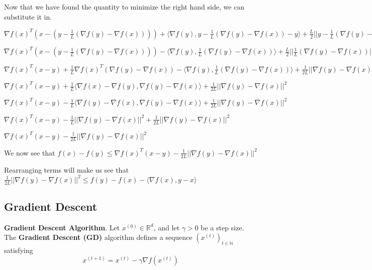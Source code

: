 Now that we have found the quantity to minimize the right hand side, we can substitute it in.

$\nabla f(x)^T(x - (y - \frac{1}{L}(\nabla f(y) - \nabla f(x)))) + \langle \nabla f(y), y - \frac{1}{L}(\nabla f(y) - \nabla f(x)) - y \rangle + \frac{L}{2} ||y - \frac{1}{L}(\nabla f(y) - \nabla f(x)) - y||^2$ \newline 

$\nabla f(x)^T(x - (y - \frac{1}{L}(\nabla f(y) - \nabla f(x)))) - \langle \nabla f(y),  \frac{1}{L}(\nabla f(y) - \nabla f(x))\rangle + \frac{L}{2} ||\frac{1}{L}(\nabla f(y) - \nabla f(x))||^2$ \newline 

$\nabla f(x)^T (x - y) + \frac{1}{L} \nabla f(x)^T (\nabla f(y) - \nabla f(x)) - \langle \nabla f(y),  \frac{1}{L}(\nabla f(y) - \nabla f(x))\rangle + \frac{1}{2L} ||\nabla f(y) - \nabla f(x)||^2$ \newline 

$\nabla f(x)^T (x - y) + \frac{1}{L} \langle \nabla f(x) - \nabla f(y), \nabla f(y) - \nabla f(x) \rangle + \frac{1}{2L} ||\nabla f(y) - \nabla f(x)||^2$ \newline 

$\nabla f(x)^T (x - y) - \frac{1}{L} \langle \nabla f(y) - \nabla f(x), \nabla f(y) - \nabla f(x) \rangle + \frac{1}{2L} ||\nabla f(y) - \nabla f(x)||^2$ \newline 

$\nabla f(x)^T (x - y) - \frac{1}{L} ||\nabla f(y) - \nabla f(x)||^2 + \frac{1}{2L} ||\nabla f(y) - \nabla f(x)||^2$ \newline 

$\nabla f(x)^T (x - y) - \frac{1}{2L} ||\nabla f(y) - \nabla f(x)||^2$ \newline 

We now see that $f(x) - f(y) \leq \nabla f(x)^T (x - y) - \frac{1}{2L} ||\nabla f(y) - \nabla f(x)||^2$

Rearranging terms will make us see that $\frac{1}{2L} ||\nabla f(y) - \nabla f(x)||^2 \leq f(y) - f(x) - \langle \nabla f(x), y - x \rangle$
\subsection{Gradient Descent}
\noindent \textbf{Gradient Descent Algorithm}. Let $x^{(0)} \in \mathbb{R}^d$, and let $\gamma > 0$ be a step size. The \textbf{Gradient Descent (GD)} algorithm defines a sequence $(x^{(t)})_{t \in \mathbb{N}}$ satisfying
\begin{equation}
    x^{(t + 1)}  = x^{(t)} - \gamma \nabla f(x^{(t)})
\end{equation}

